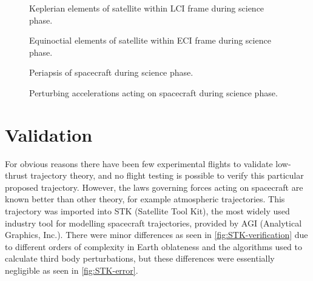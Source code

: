 \begin{figure}
\centering
\def\svgwidth{\figurewidth}

\caption{Keplerian elements of satellite within LCI frame during science phase.}
\label{fig:Science-kep-lci}
\end{figure}

\begin{figure}
\centering
\def\svgwidth{\figurewidth}

\caption{Equinoctial elements of satellite within ECI frame during science phase.}
\label{fig:Science-mee}
\end{figure}

\begin{figure}
\centering
\def\svgwidth{\figurewidth}

\caption{Periapsis of spacecraft during science phase.}
\label{fig:Science-peri}
\end{figure}

\begin{figure}
\centering
\def\svgwidth{\figurewidth}

\caption{Perturbing accelerations acting on spacecraft during science phase.}
\label{fig:Science-pert}
\end{figure}

%


\clearpage


\section{Validation} \label{sec:Validation}
For obvious reasons there have been few experimental flights to validate low-thrust trajectory theory, and no flight testing is possible to verify this particular proposed trajectory. However, the laws governing forces acting on spacecraft are known better than other theory, for example atmospheric trajectories. This trajectory was imported into STK (Satellite Tool Kit), the most widely used industry tool for modelling spacecraft trajectories, provided by AGI (Analytical Graphics, Inc.). There were minor differences as seen in \autoref{fig:STK-verification} due to different orders of complexity in Earth oblateness and the algorithms used to calculate third body perturbations, but these differences were essentially negligible as seen in \autoref{fig:STK-error}.

